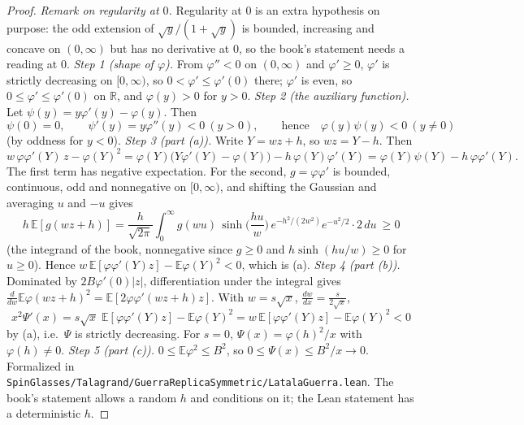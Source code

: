 \begin{proof}
  \leanok
\emph{Remark on regularity at $0$.} Regularity at $0$ is an extra hypothesis on purpose: the odd extension of $\sqrt y/(1+\sqrt y)$ is bounded, increasing and concave on $(0,\infty)$ but has no derivative at $0$, so the book's statement needs a reading at $0$.
\emph{Step 1 (shape of $\varphi$).} From $\varphi''<0$ on $(0,\infty)$ and $\varphi'\ge0$, $\varphi'$ is strictly decreasing on $[0,\infty)$, so $0<\varphi'\le\varphi'(0)$ there; $\varphi'$ is even, so $0\le\varphi'\le\varphi'(0)$ on $\mathbb R$, and $\varphi(y)>0$ for $y>0$.
\emph{Step 2 (the auxiliary function).} Let $\psi(y)=y\varphi'(y)-\varphi(y)$. Then
\[
\psi(0)=0,\qquad\psi'(y)=y\varphi''(y)<0\ (y>0),\qquad\text{hence}\quad\varphi(y)\psi(y)<0\ (y\ne0)
\]
(by oddness for $y<0$).
\emph{Step 3 (part (a)).} Write $Y=wz+h$, so $wz=Y-h$. Then
\[
w\,\varphi\varphi'(Y)\,z-\varphi(Y)^2=\varphi(Y)\big(Y\varphi'(Y)-\varphi(Y)\big)-h\,\varphi(Y)\varphi'(Y)=\varphi(Y)\psi(Y)-h\,\varphi\varphi'(Y).
\]
The first term has negative expectation. For the second, $g=\varphi\varphi'$ is bounded, continuous, odd and nonnegative on $[0,\infty)$, and shifting the Gaussian and averaging $u$ and $-u$ gives
\[
h\,\mathbb E[g(wz+h)]=\frac{h}{\sqrt{2\pi}}\int_0^\infty g(wu)\,\sinh\!\Big(\frac{hu}{w}\Big)\,e^{-h^2/(2w^2)}e^{-u^2/2}\cdot2\,du\ \ge0
\]
(the integrand of the book, nonnegative since $g\ge0$ and $h\sinh(hu/w)\ge0$ for $u\ge0$). Hence $w\,\mathbb E[\varphi\varphi'(Y)z]-\mathbb E\varphi(Y)^2<0$, which is (a).
\emph{Step 4 (part (b)).} Dominated by $2B\varphi'(0)|z|$, differentiation under the integral gives $\frac d{dw}\mathbb E\varphi(wz+h)^2=\mathbb E[2\varphi\varphi'(wz+h)z]$. With $w=s\sqrt x$, $\frac{dw}{dx}=\frac s{2\sqrt x}$,
\[
x^2\Psi'(x)=s\sqrt x\;\mathbb E[\varphi\varphi'(Y)z]-\mathbb E\varphi(Y)^2=w\,\mathbb E[\varphi\varphi'(Y)z]-\mathbb E\varphi(Y)^2<0
\]
by (a), i.e.\ $\Psi$ is strictly decreasing. For $s=0$, $\Psi(x)=\varphi(h)^2/x$ with $\varphi(h)\ne0$.
\emph{Step 5 (part (c)).} $0\le\mathbb E\varphi^2\le B^2$, so $0\le\Psi(x)\le B^2/x\to0$.
Formalized in \texttt{SpinGlasses/Talagrand/GuerraReplicaSymmetric/LatalaGuerra.lean}. The book's statement allows a random $h$ and conditions on it; the Lean statement has a deterministic $h$.
\end{proof}

